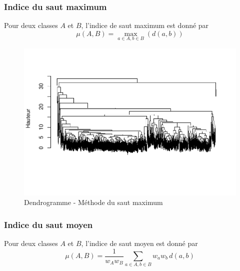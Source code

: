 \documentclass[
]{article}
\begin{document}
\hypertarget{indice-du-saut-maximum}{%
\subsubsection{Indice du saut maximum}\label{indice-du-saut-maximum}}

Pour deux classes \(A\) et \(B\), l'indice de saut maximum est donné par
\[
  \mu(A, B) = \max_{a \in A, b \in B} \left(d(a, b) \right)
\]

\begin{figure}[H]

{\centering \includegraphics{ADM_DM2_EL_MAZZOUJI_Wahel_GILLET_Louison_files/figure-latex/DendrogrammeMax-1} 

}

\caption{Dendrogramme - Méthode du saut maximum}\label{fig:DendrogrammeMax}
\end{figure}

\hypertarget{indice-du-saut-moyen}{%
\subsubsection{Indice du saut moyen}\label{indice-du-saut-moyen}}

Pour deux classes \(A\) et \(B\), l'indice de saut moyen est donné par
\[
  \mu(A, B) = \frac{1}{w_A w_B} \sum_{a \in A, b \in B} w_a w_b \, d(a, b)
\]
\end{document}
